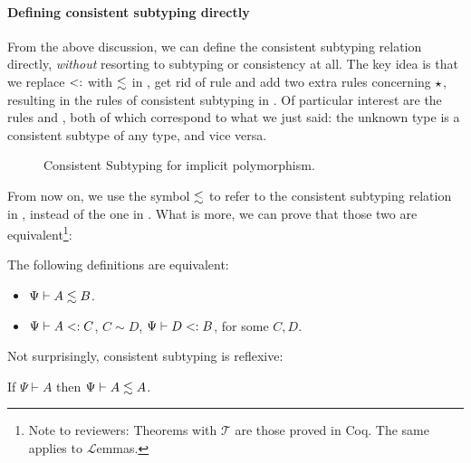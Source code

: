 \paragraph{Defining consistent subtyping directly}

From the above discussion, we can define the consistent subtyping relation
directly, \textit{without} resorting to subtyping or consistency at all. The key
idea is that we replace $<:$ with $\lesssim$ in
, get rid of rule  and add two
extra rules concerning $\star$, resulting in the rules of consistent
subtyping in . Of particular interest are the rules
 and , both of which correspond to what we
just said: the unknown type is a consistent subtype of any type, and vice versa.
\begin{figure}[t]
  \begin{small}
  \end{small}
  \caption{Consistent Subtyping for implicit polymorphism.}
  \label{fig:decl:conssub}
\end{figure}
From now on, we use the symbol $\lesssim$ to refer to the consistent subtyping
relation in , instead of the one in
. What is more, we can prove that those two are
equivalent\footnote{Note to reviewers: Theorems with $\mathcal{T}$ are those
  proved in Coq. The same applies to $\mathcal{L}$emmas.}:

\begin{ctheorem} The following definitions are equivalent:
  \label{lemma:properties-conssub}
  \begin{itemize}
  \item  $\Psi {} \vdash A \lesssim B$.
  \item  $\Psi {} \vdash A <: C$, $C \sim D$, $\Psi {} \vdash D <: B$, for some $C, D$.
  \end{itemize}
\end{ctheorem}

\noindent Not surprisingly, consistent subtyping is reflexive:

\begin{clemma} \label{lemma:sub_refl}%
  If $\Psi \vdash A$ then $\Psi \vdash A \lesssim A$.
\end{clemma}

